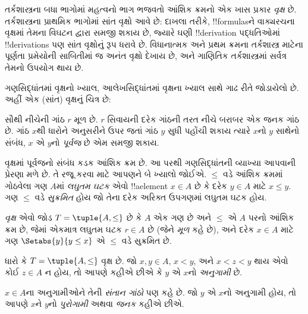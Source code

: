 \documentclass[../../../include/open-logic-section]{subfiles}
\begin{document}

તર્કશાસ્ત્રના બધા ભાગોમાં મહત્વનો ભાગ ભજવતો આંશિક ક્રમનો
એક ખાસ પ્રકાર \emph{વૃક્ષ} છે. તર્કશાસ્ત્રના પ્રાથમિક ભાગોમાં
સાંત વૃક્ષો આવે છે: દાખલા તરીકે, !!{formula}sને વાક્યરચના
વૃક્ષમાં તેમના વિઘટન દ્વારા સમજી શકાય છે, જ્યારે ઘણી
!!{derivation} પદ્ધતિઓમાં !!{derivation}s પણ સાંત વૃક્ષોનું
રૂપ ધરાવે છે.
%
વિધાનાત્મક અને પ્રથમ ક્રમના તર્કશાસ્ત્ર માટેના પૂર્ણતા પ્રમેયોની
સાબિતીમાં જ અનંત વૃક્ષો દેખાય છે, અને ગાણિતિક તર્કશાસ્ત્રમાં
સર્વત્ર તેમનો ઉપયોગ થાય છે.

ગણસિદ્ધાંતમાં વૃક્ષનો ખ્યાલ, આલેખસિદ્ધાંતમાં વૃક્ષના ખ્યાલ સાથે
ગાઢ રીતે જોડાયેલો છે. અહીં એક (સાંત) વૃક્ષનું ચિત્ર છે:

\begin{center}
\end{center}

સૌથી નીચેની ગાંઠ $r$ મૂળ છે. $r$ સિવાયની દરેક ગાંઠની
તરત નીચે બરાબર એક જનક ગાંઠ છે.
ગાંઠ $x$થી ધારોને અનુસરીને ઉપર જતાં ગાંઠ $y$ સુધી પહોંચી
શકાય ત્યારે $x$નો $y$ સાથેનો સંબંધ,
$x$ એ $y$નો \emph{પૂર્વજ} છે એમ સમજી શકાય.

વૃક્ષમાં પૂર્વજનો સંબંધ કડક આંશિક ક્રમ છે.
આ પરથી ગણસિદ્ધાંતની વ્યાખ્યા આપવાની પ્રેરણા મળે છે.
તે રજૂ કરવા માટે આપણને બે ખ્યાલો જોઈએ.
$\le$ વડે આંશિક ક્રમમાં ગોઠવેલા ગણ $A$માં
\emph{લઘુતમ ઘટક} એવો !!a{element} $x \in A$ છે
કે દરેક $y \in A$ માટે $x \le y$.
ગણ $\le$ વડે \emph{સુક્રમિત} હોય જો તેના દરેક
અરિક્ત ઉપગણમાં લઘુતમ ઘટક હોય.

\begin{defn}[વૃક્ષ]
\emph{વૃક્ષ} એવો જોડ $T = \tuple{A, \le}$ છે કે $A$ એક ગણ છે
અને $\le$ એ $A$ પરનો આંશિક ક્રમ છે, જેમાં એકમાત્ર લઘુતમ
ઘટક $r \in A$ છે (જેને \emph{મૂળ} કહે છે), અને
દરેક $x \in A$ માટે ગણ $\Setabs{y}{y \le x}$
એ $\le$ વડે સુક્રમિત છે.
\end{defn}

\begin{defn}[અનુગામીઓ]
ધારો કે $T = \tuple{A, \le}$ વૃક્ષ છે.
જો $x,y \in A$, $x < y$, અને $x < z < y$
થાય એવો કોઈ $z \in A$ ન હોય, તો આપણે કહીએ છીએ કે
$y$ એ $x$નો \emph{અનુગામી} છે.
\end{defn}

$x \in A$ના અનુગામીઓને તેની \emph{સંતાન ગાંઠો} પણ કહે છે.
જો $y$ એ $x$નો અનુગામી હોય, તો આપણે $x$ને $y$નો
\emph{પુરોગામી} અથવા \emph{જનક} કહીએ છીએ.
\end{document}
